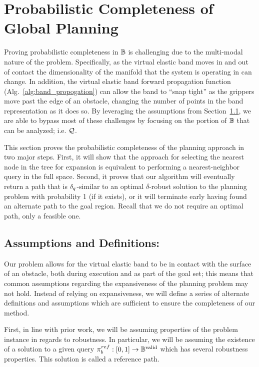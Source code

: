 \section{Probabilistic Completeness of Global Planning}
\label{sec:analysis}

Proving probabilistic completeness in $\mathbb{B}$ is challenging due to the multi-modal nature of the problem. Specifically, as the virtual elastic band moves in and out of contact the dimensionality of the manifold that the system is operating in can change. In addition, the virtual elastic band forward propagation function (Alg.~\ref{alg:band_propogation}) can allow the band to ``snap tight'' as the grippers move past the edge of an obstacle, changing the number of points in the band representation as it does so. By leveraging the assumptions from Section~\ref{sec:rpath_assumptions}, we are able to bypass most of these challenges by focusing on the portion of $\mathbb{B}$ that can be analyzed; i.e. $\mathcal{Q}$.

This section proves the probabilistic completeness of the planning approach in two major steps.  First, it will show that the approach for selecting the nearest node in the tree for expansion is equivalent to performing a nearest-neighbor query in the full space.  Second, it proves that our algorithm will eventually return a path that is $\delta_q$-similar to an optimal $\delta$-robust solution to the planning problem with probability 1 (if it exists), or it will terminate early having found an alternate path to the goal region. Recall that we do not require an optimal path, only a feasible one.

\subsection{Assumptions and Definitions:}
\label{sec:rpath_assumptions}
Our problem allows for the virtual elastic band to be in contact with the surface of an obstacle, both during execution and as part of the goal set; this means that common assumptions regarding the expansiveness \cite{Hsu1999} of the planning problem may not hold. Instead of relying on expansiveness, we will define a series of alternate definitions and assumptions which are sufficient to ensure the completeness of our method.

First, in line with prior work, we will be assuming properties of the problem instance in regards to robustness.  In particular, we will be assuming the existence of a solution to a given query $\pi_{b}^{ref} : [0, 1] \rightarrow \mathbb{B}^\textrm{valid}$ which has several robustness properties.  This solution is called a reference path.

